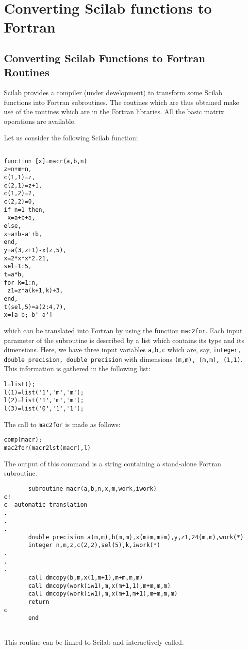 \chapter{Converting Scilab functions to Fortran}

\section{Converting Scilab Functions to Fortran Routines}

Scilab provides a compiler (under development) to transform some Scilab 
functions
into Fortran subroutines. The routines which are thus obtained
make use of the routines which are in the Fortran libraries.
All the basic matrix operations are available.

Let us consider the following Scilab function:
\begin{verbatim}

function [x]=macr(a,b,n)
z=n+m+n,
c(1,1)=z,
c(2,1)=z+1,
c(1,2)=2,
c(2,2)=0,
if n=1 then,
 x=a+b+a,
else,
x=a+b-a'+b,
end,
y=a(3,z+1)-x(z,5),
x=2*x*x*2.21,
sel=1:5,
t=a*b,
for k=1:n,
 z1=z*a(k+1,k)+3,
end,
t(sel,5)=a(2:4,7),
x=[a b;-b' a']

\end{verbatim}

which can be translated into Fortran by using the function {\tt mac2for}.
Each input parameter of the subroutine is described by a list
which contains its type and its dimensions. Here, we have three
input variables {\tt a,b,c} which are, say, {\tt integer,
double precision, double precision} with dimensions
{\tt (m,m), (m,m), (1,1)}. This information is gathered
in the following list:
\begin{verbatim}
l=list();
l(1)=list('1','m','m');
l(2)=list('1','m','m');
l(3)=list('0','1','1');
\end{verbatim}
The call to {\tt mac2for} is made as follows:
\begin{verbatim}
comp(macr);
mac2for(macr2lst(macr),l)
\end{verbatim}
The output of this command is a string containing a stand-alone Fortran 
subroutine.
\begin{verbatim}
       subroutine macr(a,b,n,x,m,work,iwork)
c!
c  automatic translation
.
.
.
       double precision a(m,m),b(m,m),x(m+m,m+m),y,z1,24(m,m),work(*)
       integer n,m,z,c(2,2),sel(5),k,iwork(*)
.
.
.      
       call dmcopy(b,m,x(1,m+1),m+m,m,m)
       call dmcopy(work(iw1),m,x(m+1,1),m+m,m,m)
       call dmcopy(work(iw1),m,x(m+1,m+1),m+m,m,m)
       return
c
       end


\end{verbatim}
This routine can be linked to Scilab and interactively called.

